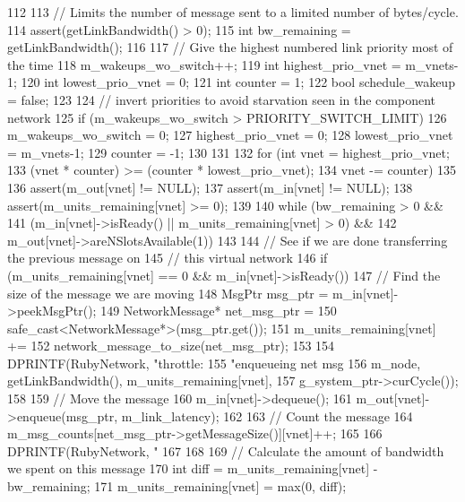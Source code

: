 \begin{DoxyCode}
112 {
113     // Limits the number of message sent to a limited number of bytes/cycle.
114     assert(getLinkBandwidth() > 0);
115     int bw_remaining = getLinkBandwidth();
116 
117     // Give the highest numbered link priority most of the time
118     m_wakeups_wo_switch++;
119     int highest_prio_vnet = m_vnets-1;
120     int lowest_prio_vnet = 0;
121     int counter = 1;
122     bool schedule_wakeup = false;
123 
124     // invert priorities to avoid starvation seen in the component network
125     if (m_wakeups_wo_switch > PRIORITY_SWITCH_LIMIT) {
126         m_wakeups_wo_switch = 0;
127         highest_prio_vnet = 0;
128         lowest_prio_vnet = m_vnets-1;
129         counter = -1;
130     }
131 
132     for (int vnet = highest_prio_vnet;
133          (vnet * counter) >= (counter * lowest_prio_vnet);
134          vnet -= counter) {
135 
136         assert(m_out[vnet] != NULL);
137         assert(m_in[vnet] != NULL);
138         assert(m_units_remaining[vnet] >= 0);
139 
140         while (bw_remaining > 0 &&
141             (m_in[vnet]->isReady() || m_units_remaining[vnet] > 0) &&
142             m_out[vnet]->areNSlotsAvailable(1)) {
143 
144             // See if we are done transferring the previous message on
145             // this virtual network
146             if (m_units_remaining[vnet] == 0 && m_in[vnet]->isReady()) {
147                 // Find the size of the message we are moving
148                 MsgPtr msg_ptr = m_in[vnet]->peekMsgPtr();
149                 NetworkMessage* net_msg_ptr =
150                     safe_cast<NetworkMessage*>(msg_ptr.get());
151                 m_units_remaining[vnet] +=
152                     network_message_to_size(net_msg_ptr);
153 
154                 DPRINTF(RubyNetwork, "throttle: %
155                         "enqueueing net msg %
156                         m_node, getLinkBandwidth(), m_units_remaining[vnet],
157                         g_system_ptr->curCycle());
158 
159                 // Move the message
160                 m_in[vnet]->dequeue();
161                 m_out[vnet]->enqueue(msg_ptr, m_link_latency);
162 
163                 // Count the message
164                 m_msg_counts[net_msg_ptr->getMessageSize()][vnet]++;
165 
166                 DPRINTF(RubyNetwork, "%
167             }
168 
169             // Calculate the amount of bandwidth we spent on this message
170             int diff = m_units_remaining[vnet] - bw_remaining;
171             m_units_remaining[vnet] = max(0, diff);
}}}
\end{DoxyCode}
